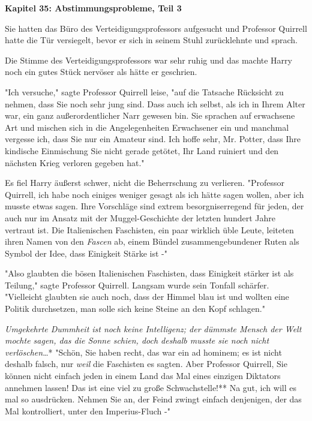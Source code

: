 

\hypertarget{abstimmungsprobleme-teil-3}{%

\textbf{Kapitel 35: Abstimmungsprobleme, Teil 3}

Sie hatten das Büro des Verteidigungsprofessors aufgesucht und Professor Quirrell hatte die Tür versiegelt, bevor er sich in seinem Stuhl zurücklehnte und sprach.

Die Stimme des Verteidigungsprofessors war sehr ruhig und das machte Harry noch ein gutes Stück nervöser als hätte er geschrien.

"Ich versuche," sagte Professor Quirrell leise, "auf die Tatsache Rücksicht zu nehmen, dass Sie noch sehr jung sind. Dass auch ich selbst, als ich in Ihrem Alter war, ein ganz außerordentlicher Narr gewesen bin. Sie sprachen auf erwachsene Art und mischen sich in die Angelegenheiten Erwachsener ein und manchmal vergesse ich, dass Sie nur ein Amateur sind. Ich hoffe sehr, Mr. Potter, dass Ihre kindische Einmischung Sie nicht gerade getötet, Ihr Land ruiniert und den nächsten Krieg verloren gegeben hat."

Es fiel Harry äußerst schwer, nicht die Beherrschung zu verlieren. "Professor Quirrell, ich habe noch einiges weniger gesagt als ich hätte sagen wollen, aber ich musste etwas sagen. Ihre Vorschläge sind extrem besorgniserregend für jeden, der auch nur im Ansatz mit der Muggel-Geschichte der letzten hundert Jahre vertraut ist. Die Italienischen Faschisten, ein paar wirklich üble Leute, leiteten ihren Namen von den \emph{Fascen} ab, einem Bündel zusammengebundener Ruten als Symbol der Idee, dass Einigkeit Stärke ist -"

"Also glaubten die bösen Italienischen Faschisten, dass Einigkeit stärker ist als Teilung," sagte Professor Quirrell. Langsam wurde sein Tonfall schärfer. "Vielleicht glaubten sie auch noch, dass der Himmel blau ist und wollten eine Politik durchsetzen, man solle sich keine Steine an den Kopf schlagen."

\emph{Umgekehrte Dummheit ist noch keine Intelligenz; der dümmste Mensch der Welt mochte sagen, das die Sonne schien, doch deshalb musste sie noch nicht verlöschen}…* "Schön, Sie haben recht, das war ein ad hominem; es ist nicht deshalb falsch, nur \emph{weil} die Faschisten es sagten. Aber Professor Quirrell, Sie können nicht einfach jeden in einem Land das Mal eines einzigen Diktators annehmen lassen! Das ist eine viel zu große Schwachstelle!** Na gut, ich will es mal so ausdrücken. Nehmen Sie an, der Feind zwingt einfach denjenigen, der das Mal kontrolliert, unter den Imperius-Fluch -"

}
